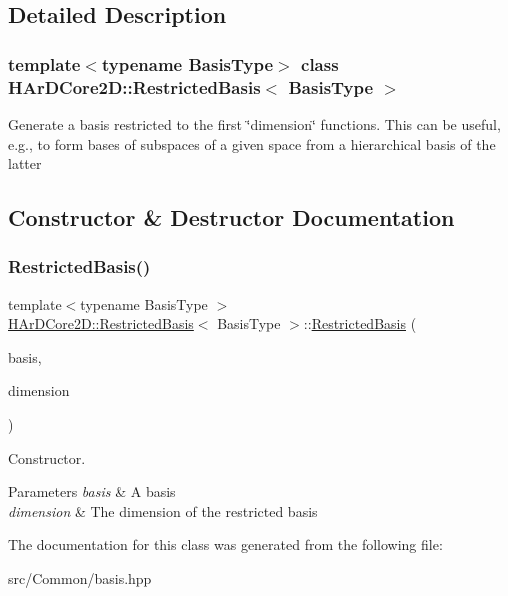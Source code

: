 \subsection{Detailed Description}
\subsubsection*{template$<$typename Basis\+Type$>$\newline
class H\+Ar\+D\+Core2\+D\+::\+Restricted\+Basis$<$ Basis\+Type $>$}

Generate a basis restricted to the first \char`\"{}dimension\char`\"{} functions. This can be useful, e.\+g., to form bases of subspaces of a given space from a hierarchical basis of the latter 

\subsection{Constructor \& Destructor Documentation}
\mbox{\label{classHArDCore2D_1_1RestrictedBasis_a3c6a0bd9f6d2d6411762613b363f1716}} 
\subsubsection{\texorpdfstring{Restricted\+Basis()}{RestrictedBasis()}}
{\footnotesize\ttfamily template$<$typename Basis\+Type $>$ \\
\hyperlink{classHArDCore2D_1_1RestrictedBasis}{H\+Ar\+D\+Core2\+D\+::\+Restricted\+Basis}$<$ Basis\+Type $>$\+::\hyperlink{classHArDCore2D_1_1RestrictedBasis}{Restricted\+Basis} (\begin{DoxyParamCaption}\item[{const Basis\+Type \&}]{basis,  }\item[{const size\+\_\+t \&}]{dimension }\end{DoxyParamCaption})\hspace{0.3cm}{\ttfamily [inline]}}



Constructor. 


\begin{DoxyParams}{Parameters}
{\em basis} & A basis \\
\hline
{\em dimension} & The dimension of the restricted basis \\
\hline
\end{DoxyParams}


The documentation for this class was generated from the following file\+:\begin{DoxyCompactItemize}
\item 
src/\+Common/basis.\+hpp\end{DoxyCompactItemize}
